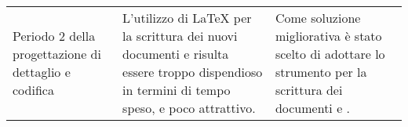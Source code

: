 {\begin{longtable}{ C{3cm} C{5.5cm} C{5.5cm}}
	Periodo 2 della progettazione di dettaglio e codifica & L'utilizzo di \LaTeX{} per la scrittura dei nuovi documenti \MM e \MU risulta essere troppo dispendioso in termini di tempo speso, e poco attrattivo. & Come soluzione migliorativa è stato scelto di adottare lo strumento  per la scrittura dei documenti \MM e \MU.\\
	
	
\end{longtable}
}






